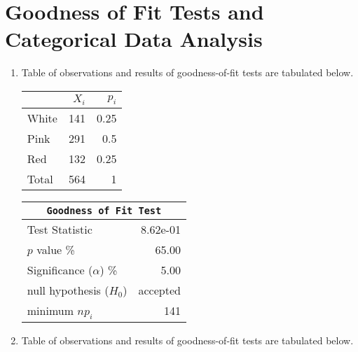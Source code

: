 \chapter{Goodness of Fit Tests and Categorical Data Analysis}

\begin{enumerate}
	
	\item Table of observations and results of goodness-of-fit tests are tabulated below.
	
	\begin{table}[H]
		\centering
		\begin{minipage}{0.4\textwidth}
			\centering
			\begin{tabular}{@{}lrr@{}}
				\toprule
				{} & $X_i$ & $p_i$ \\
				\midrule
				White &   141 &  0.25 \\
				Pink  &   291 &   0.5 \\
				Red   &   132 &  0.25 \\
				\midrule
				Total &   564 &     1 \\
				\bottomrule
			\end{tabular}
			
		\end{minipage}
		\begin{minipage}{0.4\textwidth}
			\centering
			\begin{tabular}{@{}lr@{}}
				\toprule
				\multicolumn{2}{c}{\texttt{Goodness of Fit Test}} \\
				\midrule
				Test Statistic             &  8.62e-01 \\
				$p$ value \%               &     65.00 \\
				Significance ($\alpha$) \% &      5.00 \\
				null hypothesis ($H_0$)    &  accepted \\
				minimum $n p_i$            &       141 \\
				\bottomrule
			\end{tabular}
			
		\end{minipage}
	\end{table}
	\bigskip
	
	\item Table of observations and results of goodness-of-fit tests are tabulated below.
	

\end{enumerate}
